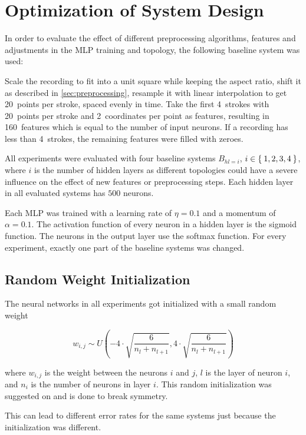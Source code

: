
\section{Optimization of System Design}\label{ch:Optimization-of-System-Design}
In order to evaluate the effect of different preprocessing algorithms, features
and adjustments in the \gls{MLP} training and topology, the following baseline
system was used:

Scale the recording to fit into a unit square while keeping the aspect ratio,
shift it as described in \cref{sec:preprocessing},
resample it with linear interpolation to get 20~points per stroke, spaced
evenly in time. Take the first 4~strokes with 20~points per stroke and
2~coordinates per point as features, resulting in 160~features which is equal
to the number of input neurons. If a recording has less than 4~strokes, the
remaining features were filled with zeroes.

All experiments were evaluated with four baseline systems $B_{hl=i}$, $i \in \Set{1,
2, 3, 4}$, where $i$ is the number of hidden layers as different topologies
could have a severe influence on the effect of new features or preprocessing
steps. Each hidden layer in all evaluated systems has $500$ neurons.

Each \gls{MLP} was trained with a learning rate of $\eta = 0.1$ and a momentum
of $\alpha = 0.1$. The activation function of every neuron in a hidden layer is
the sigmoid function. The neurons in the
output layer use the softmax function. For every experiment, exactly one part
of the baseline systems was changed.


\subsection{Random Weight Initialization}
The neural networks in all experiments got initialized with a small random
weight

\[w_{i,j} \sim U(-4 \cdot \sqrt{\frac{6}{n_l + n_{l+1}}}, 4 \cdot \sqrt{\frac{6}{n_l + n_{l+1}}})\]

where $w_{i,j}$ is the weight between the neurons $i$ and $j$, $l$ is the layer
of neuron $i$, and $n_i$ is the number of neurons in layer $i$. This random
initialization was suggested on
\cite{deeplearningweights} and is done to break symmetry.

This can lead to different error rates for the same systems just because the
initialization was different.

